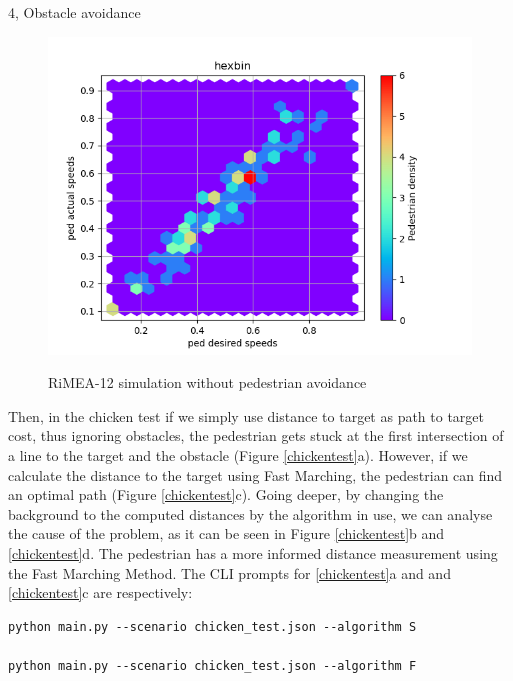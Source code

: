 \begin{task}{4, Obstacle avoidance}
\begin{figure}[H]
{\includegraphics[scale=0.45]{report-template/image/rimea12graphnoped.png}}
\caption{RiMEA-12 simulation without pedestrian avoidance}
\label{rimea12withoutped}
\end{figure}

Then, in the chicken test if we simply use distance to target as path to target cost, thus ignoring obstacles, the pedestrian gets stuck at the first intersection of a line to the target and the obstacle (Figure \ref{chickentest}a). However, if we calculate the distance to the target using Fast Marching, the pedestrian can find an optimal path (Figure \ref{chickentest}c). Going deeper, by changing the background to the computed distances by the algorithm in use, we can analyse the cause of the problem, as it can be seen in Figure \ref{chickentest}b and \ref{chickentest}d. The pedestrian has a more informed distance measurement using the Fast Marching Method. The CLI prompts for \ref{chickentest}a and and \ref{chickentest}c are respectively:
\begin{verbatim}
python main.py --scenario chicken_test.json --algorithm S

python main.py --scenario chicken_test.json --algorithm F 
\end{verbatim}



\end{task}
